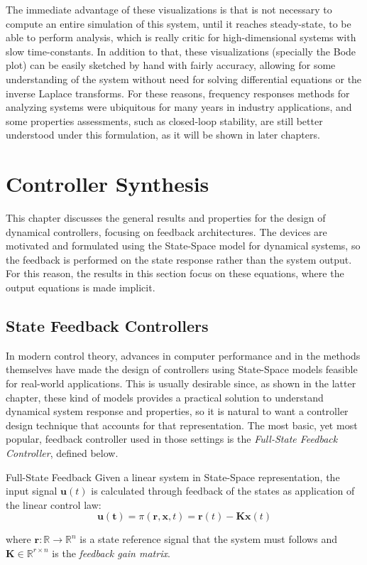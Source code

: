 \documentclass[a4paper,11pt]{book}
\numberwithin{figure}{chapter}
\numberwithin{equation}{chapter}
\numberwithin{table}{chapter}
\theoremstyle{definition}
\newtheorem{definition}{Definition}[chapter]
\newcounter{boxed-theorem}
\newcounter{boxed-definition}
\newenvironment{boxed-definition}[1]
{\begin{shaded} \begin{definition}{#1}}
{\end{definition} \end{shaded}}
\begin{document}
The immediate advantage of these visualizations is that is not necessary to compute an entire simulation of this system, until it reaches steady-state, to be able to perform analysis, which is really critic for high-dimensional systems with slow time-constants. In addition to that, these visualizations (specially the Bode plot) can be easily sketched by hand with fairly accuracy, allowing for some understanding of the system without need for solving differential equations or the inverse Laplace transforms. For these reasons, frequency responses methods for analyzing systems were ubiquitous for many years in industry applications, and some properties assessments, such as closed-loop stability, are still better understood under this formulation, as it will be shown in later chapters.

\clearpage
\chapter{Controller Synthesis}

This chapter discusses the general results and properties for the design of dynamical controllers, focusing on feedback architectures. The devices are motivated and formulated using the State-Space model for dynamical systems, so the feedback is performed on the state response rather than the system output. For this reason, the results in this section focus on these equations, where the output equations is made implicit.

\section{State Feedback Controllers}

In modern control theory, advances in computer performance and in the methods themselves have made the design of controllers using State-Space models feasible for real-world applications. This is usually desirable since, as shown in the latter chapter, these kind of models provides a practical solution to understand dynamical system response and properties, so it is natural to want a controller design technique that accounts for that representation. The most basic, yet most popular, feedback controller used in those settings is the \textit{Full-State Feedback Controller}, defined below. 

\begin{boxed-definition}{Full-State Feedback}
	Given a linear system in State-Space representation, the input signal $\bm{u}(t)$ is calculated through feedback of the states as application of the linear control law:
	\begin{equation}
		\bm{u(t)} = \pi(\bm{r}, \bm{x}, t) = \bm{r}(t) - \bm{K} \bm{x}(t)
	\end{equation}
	
	\noindent where $\bm{r} : \mathbb{R} \rightarrow \mathbb{R}^{n}$ is a state reference signal that the system must follows and $\bm{K} \in \mathbb{R}^{r \times n}$ is the \textit{feedback gain matrix}.
\end{boxed-definition}
\end{document}
